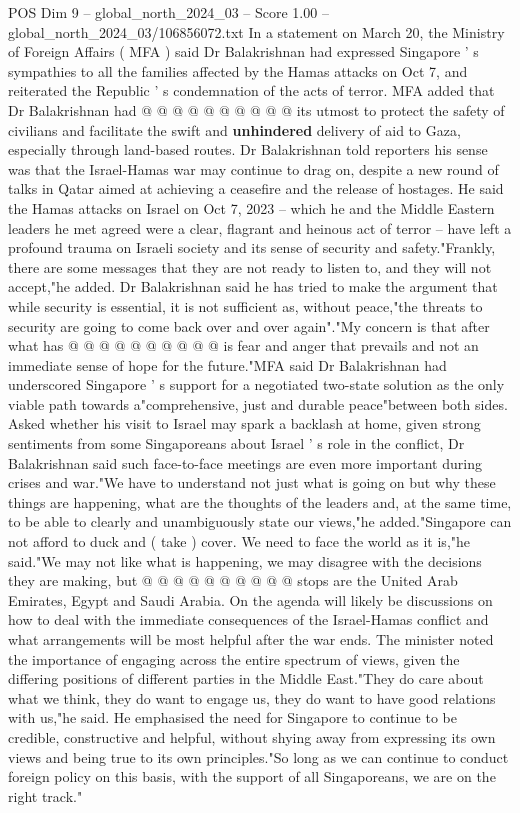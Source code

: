 \begin{textsample}{POS Dim 9 – global\_north\_2024\_03 – Score 1.00 – global\_north\_2024\_03/106856072.txt}
In a statement on March 20, the Ministry of Foreign Affairs ( MFA ) said Dr Balakrishnan had expressed Singapore ' s sympathies to all the families affected by the Hamas attacks on Oct 7, and reiterated the Republic ' s condemnation of the acts of terror.
MFA added that Dr Balakrishnan had @ @ @ @ @ @ @ @ @ @ its utmost to protect the safety of civilians and facilitate the swift and \textbf{unhindered} delivery of aid to Gaza, especially through land-based routes.
Dr Balakrishnan told reporters his sense was that the Israel-Hamas war may continue to drag on, despite a new round of talks in Qatar aimed at achieving a ceasefire and the release of hostages.
He said the Hamas attacks on Israel on Oct 7, 2023 -- which he and the Middle Eastern leaders he met agreed were a clear, flagrant and heinous act of terror -- have left a profound trauma on Israeli society and its sense of security and safety."Frankly, there are some messages that they are not ready to listen to, and they will not accept,"he added.
Dr Balakrishnan said he has tried to make the argument that while security is essential, it is not sufficient as, without peace,"the threats to security are going to come back over and over again"."My concern is that after what has @ @ @ @ @ @ @ @ @ @ is fear and anger that prevails and not an immediate sense of hope for the future."MFA said Dr Balakrishnan had underscored Singapore ' s support for a negotiated two-state solution as the only viable path towards a"comprehensive, just and durable peace"between both sides.
Asked whether his visit to Israel may spark a backlash at home, given strong sentiments from some Singaporeans about Israel ' s role in the conflict, Dr Balakrishnan said such face-to-face meetings are even more important during crises and war."We have to understand not just what is going on but why these things are happening, what are the thoughts of the leaders and, at the same time, to be able to clearly and unambiguously state our views,"he added."Singapore can not afford to duck and ( take ) cover.
We need to face the world as it is,"he said."We may not like what is happening, we may disagree with the decisions they are making, but @ @ @ @ @ @ @ @ @ @ stops are the United Arab Emirates, Egypt and Saudi Arabia.
On the agenda will likely be discussions on how to deal with the immediate consequences of the Israel-Hamas conflict and what arrangements will be most helpful after the war ends.
The minister noted the importance of engaging across the entire spectrum of views, given the differing positions of different parties in the Middle East."They do care about what we think, they do want to engage us, they do want to have good relations with us,"he said.
He emphasised the need for Singapore to continue to be credible, constructive and helpful, without shying away from expressing its own views and being true to its own principles."So long as we can continue to conduct foreign policy on this basis, with the support of all Singaporeans, we are on the right track."

\end{textsample}
